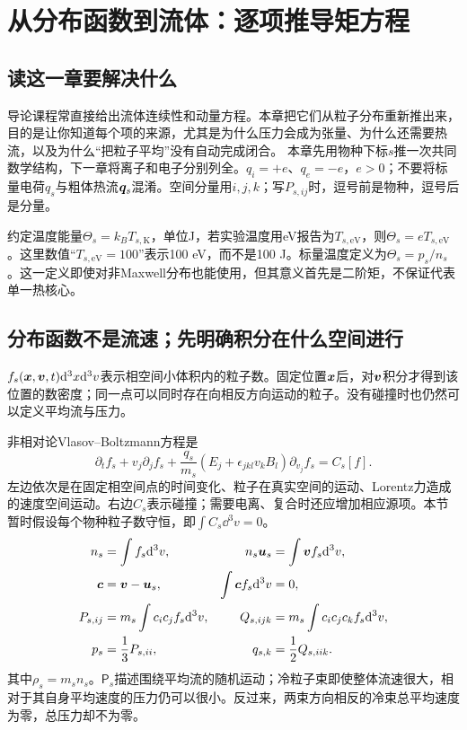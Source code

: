 \chapter{从分布函数到流体：逐项推导矩方程}
\label{hall:sec:moments}
\section*{读这一章要解决什么}
导论课程常直接给出流体连续性和动量方程。本章把它们从粒子分布重新推出来，目的是让你知道每个项的来源，尤其是为什么压力会成为张量、为什么还需要热流，以及为什么“把粒子平均”没有自动完成闭合。
本章先用物种下标$s$推一次共同数学结构，下一章将离子和电子分别列全。$q_i=+e$、$q_e=-e$，$e>0$；不要将标量电荷$q_s$与粗体热流$\bm{q}_s$混淆。空间分量用$i,j,k$；写$P_{s,ij}$时，逗号前是物种，逗号后是分量。

约定温度能量$\Theta_s=k_BT_{s,\mathrm K}$，单位J，若实验温度用eV报告为$T_{s,\mathrm{eV}}$，则$\Theta_s=eT_{s,\mathrm{eV}}$。这里数值“$T_{s,\mathrm{eV}}=100$”表示100 eV，而不是100 J。标量温度定义为$\Theta_s=p_s/n_s$。这一定义即使对非Maxwell分布也能使用，但其意义首先是二阶矩，不保证代表单一热核心。

\section{分布函数不是流速；先明确积分在什么空间进行}
$f_s(\bm{x},\bm{v},t)\mathrm d^3x\mathrm d^3v$表示相空间小体积内的粒子数。固定位置$\bm{x}$后，对$\bm{v}$积分才得到该位置的数密度；同一点可以同时存在向相反方向运动的粒子。没有碰撞时也仍然可以定义平均流与压力。

非相对论Vlasov--Boltzmann方程是
\begin{equation}
 \partial_tf_s+v_j\partial_jf_s+
 \frac{q_s}{m_s}(E_j+\epsilon_{jkl}v_kB_l)\partial_{v_j}f_s=C_s[f].
 \label{hall:eq:vlasov}
\end{equation}
左边依次是在固定相空间点的时间变化、粒子在真实空间的运动、Lorentz力造成的速度空间运动。右边$C_s$表示碰撞；需要电离、复合时还应增加相应源项。本节暂时假设每个物种粒子数守恒，即$\int C_s\dd^3v=0$。
\begin{align}
 n_s&=\int f_s\mathrm d^3v,&
 n_s\bm{u}_s&=\int\bm{v} f_s\mathrm d^3v,\\
 \bm{c}&=\bm{v}-\bm{u}_s,&
 \int\bm{c} f_s\mathrm d^3v&=0,\\
 P_{s,ij}&=m_s\int c_ic_j f_s\mathrm d^3v,&
 Q_{s,ijk}&=m_s\int c_ic_jc_k f_s\mathrm d^3v,\\
 p_s&=\frac13P_{s,ii},&
 q_{s,k}&=\frac12Q_{s,iik}.
\end{align}
其中$\rho_s=m_sn_s$。$\mathsf P_s$描述围绕平均流的随机运动；冷粒子束即使整体流速很大，相对于其自身平均速度的压力仍可以很小。反过来，两束方向相反的冷束总平均速度为零，总压力却不为零。

